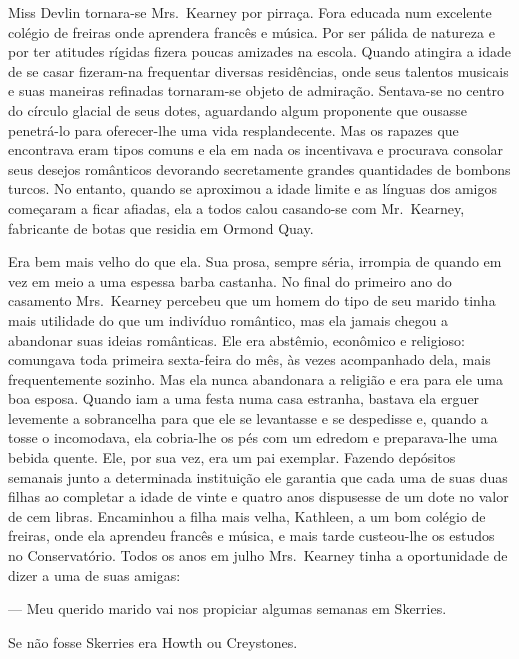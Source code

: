 Miss Devlin tornara-se Mrs.~Kearney por pirraça.  Fora educada num excelente
colégio de freiras onde aprendera francês e música.  Por ser pálida de natureza
e por ter atitudes rígidas fizera poucas amizades na escola.  Quando atingira a
idade de se casar fizeram-na frequentar diversas residências, onde seus
talentos musicais e suas maneiras refinadas tornaram-se objeto de admiração.
Sentava-se no centro do círculo glacial de seus dotes, aguardando algum
proponente que ousasse penetrá-lo para oferecer-lhe uma vida resplandecente.
Mas os rapazes que encontrava eram tipos comuns e ela em nada os incentivava e
procurava consolar seus desejos românticos devorando secretamente grandes
quantidades de bombons turcos.  No entanto, quando se aproximou a idade limite
e as línguas dos amigos começaram a ficar afiadas, ela a todos calou casando-se
com Mr.~Kearney, fabricante de botas que residia em Ormond Quay.

Era bem mais velho do que ela.  Sua prosa, sempre séria, irrompia de quando em
vez em meio a uma espessa barba castanha.  No final do primeiro ano do
casamento Mrs.~Kearney percebeu que um homem do tipo de seu marido tinha mais
utilidade do que um indivíduo romântico, mas ela jamais chegou a abandonar suas
ideias românticas.  Ele era abstêmio, econômico e religioso: comungava toda
primeira sexta-feira do mês, às vezes acompanhado dela, mais frequentemente
sozinho.  Mas ela nunca abandonara a religião e era para ele uma boa esposa.
Quando iam a uma festa numa casa estranha, bastava ela erguer levemente a
sobrancelha para que ele se levantasse e se despedisse e, quando a tosse o
incomodava, ela cobria-lhe os pés com um edredom e preparava-lhe uma bebida
quente.  Ele, por sua vez, era um pai exemplar.  Fazendo depósitos semanais
junto a determinada instituição ele garantia que cada uma de suas duas filhas
ao completar a idade de vinte e quatro anos dispusesse de um dote no valor de
cem libras.  Encaminhou a filha mais velha, Kathleen, a um bom colégio de
freiras, onde ela aprendeu francês e música, e mais tarde custeou-lhe os
estudos no Conservatório.  Todos os anos em julho Mrs.~Kearney tinha a
oportunidade de dizer a uma de suas amigas:

--- Meu querido marido vai nos propiciar algumas semanas em Skerries.

Se não fosse Skerries era Howth ou Creystones.

